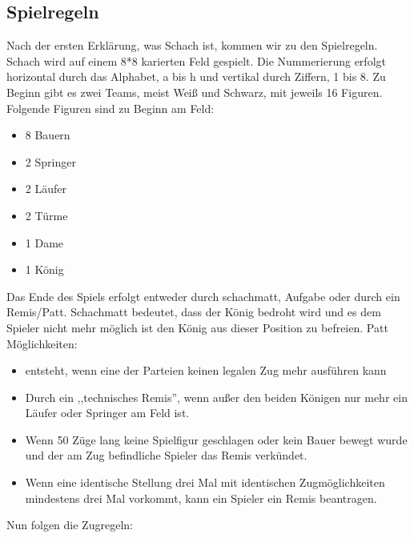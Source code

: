 \documentclass[12pt,a4paper]{article}
\begin{document}
{\subsection{Spielregeln}
\label{SUBSEC:GAMERULES}

Nach der ersten Erklärung, was Schach ist, kommen wir zu den Spielregeln.
Schach wird auf einem 8*8 karierten Feld gespielt. Die Nummerierung erfolgt horizontal durch das Alphabet, a bis h und vertikal durch Ziffern, 1 bis 8.
Zu Beginn gibt es zwei Teams, meist Weiß und Schwarz, mit jeweils 16 Figuren.
Folgende Figuren sind zu Beginn am Feld:
\begin{itemize}
	\item{8 Bauern}
	\item{2 Springer}
	\item{2 Läufer}
	\item{2 Türme}
	\item{1 Dame}
	\item{1 König}
\end{itemize}
Das Ende des Spiels erfolgt entweder durch schachmatt, Aufgabe oder durch ein Remis/Patt. Schachmatt bedeutet, dass der König bedroht wird und es dem Spieler nicht mehr möglich ist den König aus dieser Position zu befreien.
Patt Möglichkeiten:
\begin{itemize}
	\item{ entsteht, wenn eine der Parteien keinen legalen Zug mehr ausführen kann }
	\item{Durch ein ,,technisches Remis'', wenn außer den beiden Königen nur mehr ein Läufer oder Springer am Feld ist.}
	\item{Wenn 50 Züge lang keine Spielfigur geschlagen oder kein Bauer bewegt wurde und der am Zug befindliche Spieler das Remis verkündet.}
	\item{Wenn eine identische Stellung drei Mal mit identischen Zugmöglichkeiten mindestens drei Mal vorkommt, kann ein Spieler ein Remis beantragen.}
\end{itemize}

Nun folgen die Zugregeln:

}
\end{document}
